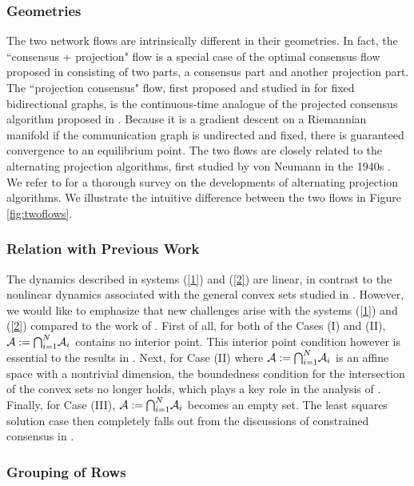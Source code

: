 \documentclass[a4paper, 11pt]{article}
\newcommand*\mcap{\mathbin{\mathpalette\mcapinn\relax}}
\newcommand*\mcapinn[2]{\vcenter{\hbox{$\mathsurround=0pt
  \ifx\displaystyle#1\textstyle\else#1\fi\bigcap$}}}
\begin{document}
\subsubsection{Geometries}
 The two network flows are intrinsically different in their geometries. In fact, the ``consensus + projection" flow  is a special case of the optimal consensus flow proposed in \cite{shitac} consisting of two parts, a consensus part and another projection part. The ``projection consensus" flow, first  proposed and studied in \cite{brian15} for fixed bidirectional graphs,  is the continuous-time analogue of the projected consensus algorithm   proposed in \cite{nedic10}. Because it is a gradient descent on a Riemannian manifold if the communication graph is undirected and fixed, there is guaranteed convergence to an equilibrium point.  The two flows are closely related to the alternating projection algorithms,  first studied by von Neumann in the 1940s \cite{jvn49}. We refer to  \cite{B-B-SIAM} for a thorough survey on the developments of alternating projection algorithms. We illustrate the intuitive  difference between the two flows in Figure \ref{fig:twoflows}.

\subsubsection{Relation with Previous Work}
The dynamics described in systems (\ref{1}) and (\ref{2}) are linear, in contrast to the nonlinear dynamics associated with the general convex sets  studied in \cite{nedic10,shitac}. However, we would like to emphasize that new challenges arise with the   systems (\ref{1}) and (\ref{2}) compared to the work of \cite{nedic10,shitac}. First of all, for both of the Cases (I) and (II), $\mathcal{A}:= \mcap_{i=1}^N\mathcal{A}_i$ contains no interior point. This interior point condition  however is essential to the  results   in   \cite{nedic10}.
Next, for Case (II) where  $\mathcal{A}:= \mcap_{i=1}^N\mathcal{A}_i$ is an affine space with a nontrivial dimension, the boundedness condition for the intersection of the convex sets no longer holds, which plays a key role in the analysis of  \cite{nedic10,shitac}. Finally, for Case (III),  $\mathcal{A}:= \mcap_{i=1}^N\mathcal{A}_i$ becomes an empty set. The least squares solution case then completely falls out from the discussions of constrained consensus in \cite{shitac,nedic10}.

\subsubsection{Grouping of Rows}
\end{document}

